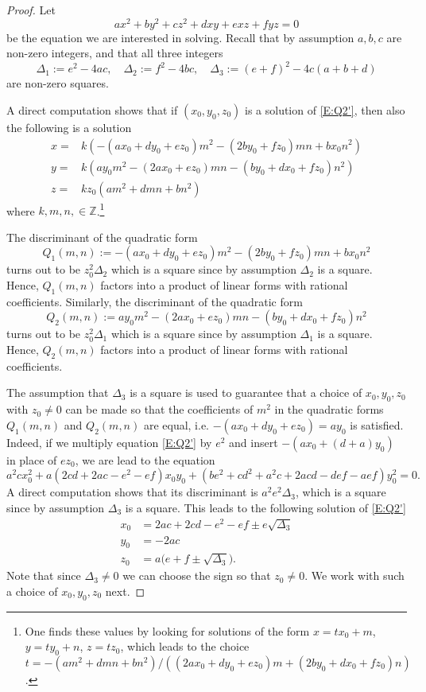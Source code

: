 \documentclass[11pt]{amsart}
\theoremstyle{definition}
\begin{document}
\begin{proof}
Let
\begin{equation}\label{E:Q2'}
ax^2+by^2+cz^2+dxy+exz+fyz=0
\end{equation}
be the equation we are interested in solving. Recall  that by
assumption $a,b,c$ are non-zero integers, and that  all three
integers
$$
\Delta_1:=e^2-4ac,  \quad \Delta_2:=f^2-4bc,  \quad
\Delta_3:=(e+f)^2-4c(a+b+d)
$$
are non-zero squares.

A direct computation shows that if $(x_0,y_0,z_0)$  is a solution of
\eqref{E:Q2'}, then also the following is  a solution
\begin{align*}
x=& k(-(ax_0+dy_0+ez_0)m^2-(2by_0+fz_0)mn+bx_0n^2) \\
y=& k(ay_0m^2-(2ax_0+ez_0)mn-(by_0+dx_0+fz_0)n^2)\\
z=& kz_0(am^2+dmn+bn^2)
\end{align*}
where $k,m,n,\in {{\mathbb Z}}$.\footnote{One finds these values by looking for
solutions of the form $x=tx_0+m$, $y=ty_0+n$, $z=tz_0$, which leads
to the choice
$t=-(am^2+dmn+bn^2)/((2ax_0+dy_0+ez_0)m+(2by_0+dx_0+fz_0)n)$. }

The discriminant of the quadratic form
$$
Q_1(m,n):=-(ax_0+dy_0+ez_0)m^2-(2by_0+fz_0)mn+bx_0n^2
$$ turns out to be $z_0^2\Delta_2$
which is a square since by assumption $\Delta_2$ is a square. Hence,
$Q_1(m,n)$ factors into a product of linear forms with rational
coefficients. Similarly, the discriminant of the quadratic form
$$
Q_2(m,n):=ay_0m^2-(2ax_0+ez_0)mn-(by_0+dx_0+fz_0)n^2
$$
turns out to be $z_0^2\Delta_1$ which is a square since by
assumption $\Delta_1$ is a square. Hence, $Q_2(m,n)$ factors into a
product of linear forms with rational coefficients.

The assumption that $\Delta_3$ is a  square is used to guarantee
that a choice of  $x_0,y_0,z_0$ with $z_0\neq 0$ can be made so that
the coefficients of $m^2$ in the quadratic forms $Q_1(m,n)$ and
$Q_2(m,n)$ are equal, i.e. $-(ax_0+dy_0+ez_0)=ay_0$ is satisfied.
Indeed, if we multiply equation \eqref{E:Q2'} by $e^2$ and insert
$-(ax_0+(d+a)y_0)$ in place of $ez_0$, we are lead  to the  equation
$$
a^2cx_0^2+a(2cd+2ac-e^2-ef)x_0y_0+(be^2+cd^2+a^2c+2acd-def-aef)y_0^2=0.
$$
A direct computation shows that its discriminant is
$a^2e^2\Delta_3$, which is a square since by assumption $\Delta_3$
is a square. This leads to  the following solution of \eqref{E:Q2'}
\begin{align*}
x_0&=2ac+2cd-e^2-ef\pm e\sqrt{\Delta_3}\\
y_0&=-2ac\\
z_0&=a\big(e+f\pm \sqrt{\Delta_3}\big).
\end{align*}
Note that since $\Delta_3\neq 0$ we can choose the sign so that
$z_0\neq 0$. We work with
 such a  choice of $x_0, y_0,z_0$ next.


\end{proof}
\end{document}
